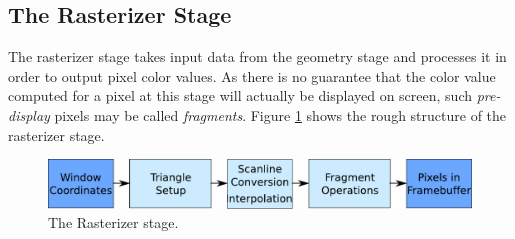 \subsection{The Rasterizer Stage}
The rasterizer stage takes input data from the geometry stage and processes it
in order to output pixel color values. As there is no guarantee that the color
value computed for a pixel at this stage will actually be displayed on screen,
such \textit{pre-display} pixels may be called \textit{fragments}. Figure
\ref{fig:RasterizerStage} shows the rough structure of the rasterizer stage.
\begin{figure}[h]
\begin{center}
\includegraphics[scale=0.5]{Images/Rasterizer-Stage.pdf}
\caption{The Rasterizer stage.}
\label{fig:RasterizerStage}
\end{center}
\end{figure}


